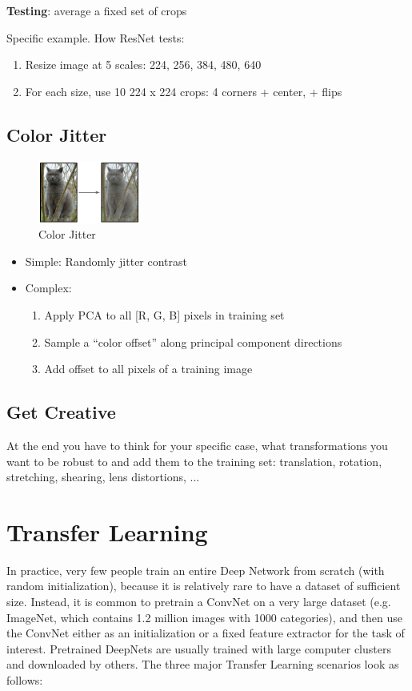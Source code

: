 \textbf{Testing}: average a fixed set of crops 

Specific example. How ResNet tests:
\begin{enumerate}
\item Resize image at 5 scales: {224, 256, 384, 480, 640}
\item For each size, use 10 224 x 224 crops: 4 corners + center, + flips
\end{enumerate}

\subsection*{Color Jitter}
\begin{figure}[!htb]
  \centering
  \includegraphics[width=0.3\textwidth]{Images/data_aug_trans/3.png}
  \caption{Color Jitter}
\end{figure}
\begin{itemize}
\item Simple: Randomly jitter contrast

\item Complex:
\begin{enumerate}
\item Apply PCA to all [R, G, B] pixels in training set
\item Sample a “color offset” along principal component directions
\item Add offset to all pixels of a training image
\end{enumerate}
\end{itemize}

\subsection*{Get Creative}
At the end you have to think for your specific case, what transformations you want to be robust to and add them to the training set: translation, 
rotation, stretching, shearing, lens distortions, ...


\section{Transfer Learning}
In practice, very few people train an entire Deep Network from scratch (with random initialization), because it is relatively rare to have a dataset of sufficient size. Instead, it is common to pretrain a ConvNet on a very large dataset (e.g. ImageNet, which contains 1.2 million images with 1000 categories), and then use the ConvNet either as an initialization or a fixed feature extractor for the task of interest. Pretrained DeepNets are usually trained with large computer clusters and downloaded by others. The three major Transfer Learning scenarios look as follows:

